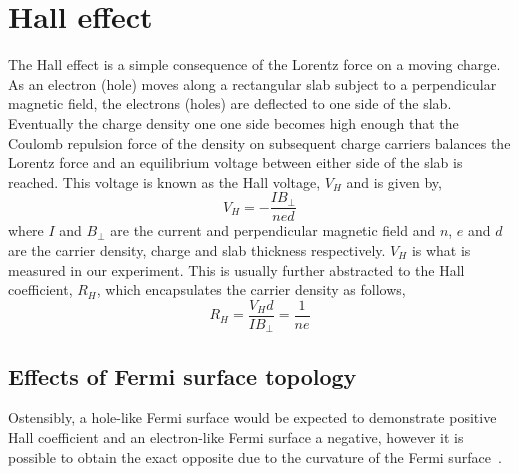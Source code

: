 
\section{Hall effect}

The Hall effect is a simple consequence of the Lorentz force on a moving charge. As an electron (hole) moves along a rectangular slab subject to a perpendicular magnetic field, the electrons (holes) are deflected to one side of the slab. Eventually the charge density one one side becomes high enough that the Coulomb repulsion force of the density on subsequent charge carriers balances the Lorentz force and an equilibrium voltage between either side of the slab is reached. This voltage is known as the Hall voltage, $V_H$ and is given by,
\begin{equation}
    V_H = -\frac{IB_{\perp}}{ned}
\end{equation}
where $I$ and $B_{\perp}$ are the current and perpendicular magnetic field and $n$, $e$ and $d$ are the carrier density, charge and slab thickness respectively. $V_H$ is what is measured in our experiment. This is usually further abstracted to the Hall coefficient, $R_H$, which encapsulates the carrier density as follows,
\begin{equation}
    R_H = \frac{V_H d}{IB_\perp} = \frac{1}{ne}
\end{equation}

% 

\subsection{Effects of Fermi surface topology}

Ostensibly, a hole-like Fermi surface would be expected to demonstrate positive Hall coefficient and an electron-like Fermi surface a negative, however it is possible to obtain the exact opposite due to the curvature of the Fermi surface~\cite{Narduzzo2008}. 

